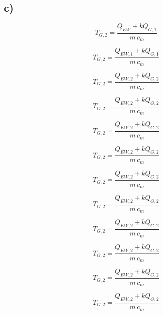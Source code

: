 

\subsection*{c)}
\begin{equation*}
    T_{G,2} = \frac{Q_{EW} + k Q_{G,1}}{m \, c_m}
\end{equation*}

\begin{equation*}
    T_{G,2} = \frac{Q_{EW,1} + k Q_{G,1}}{m \, c_m}
\end{equation*}

\begin{equation*}
    T_{G,2} = \frac{Q_{EW,2} + k Q_{G,2}}{m \, c_m}
\end{equation*}

\begin{equation*}
    T_{G,2} = \frac{Q_{EW,2} + k Q_{G,2}}{m \, c_m}
\end{equation*}

\begin{equation*}
    T_{G,2} = \frac{Q_{EW,2} + k Q_{G,2}}{m \, c_m}
\end{equation*}

\begin{equation*}
    T_{G,2} = \frac{Q_{EW,2} + k Q_{G,2}}{m \, c_m}
\end{equation*}

\begin{equation*}
    T_{G,2} = \frac{Q_{EW,2} + k Q_{G,2}}{m \, c_m}
\end{equation*}

\begin{equation*}
    T_{G,2} = \frac{Q_{EW,2} + k Q_{G,2}}{m \, c_m}
\end{equation*}

\begin{equation*}
    T_{G,2} = \frac{Q_{EW,2} + k Q_{G,2}}{m \, c_m}
\end{equation*}

\begin{equation*}
    T_{G,2} = \frac{Q_{EW,2} + k Q_{G,2}}{m \, c_m}
\end{equation*}

\begin{equation*}
    T_{G,2} = \frac{Q_{EW,2} + k Q_{G,2}}{m \, c_m}
\end{equation*}

\begin{equation*}
    T_{G,2} = \frac{Q_{EW,2} + k Q_{G,2}}{m \, c_m}
\end{equation*}

